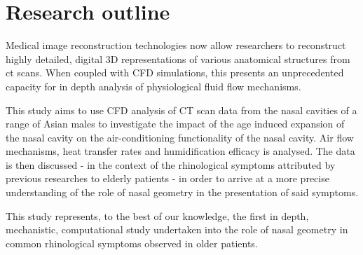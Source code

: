\section{Research outline}

Medical image reconstruction technologies now allow researchers to reconstruct highly detailed, digital 3D representations of various anatomical structures from ct scans. When coupled with CFD simulations, this presents an unprecedented capacity for in depth analysis of physiological fluid flow mechanisms.

This study aims to use CFD analysis of CT scan data from the nasal cavities of a range of Asian males to investigate the impact of the age induced expansion of the nasal cavity on the air-conditioning functionality of the nasal cavity. Air flow mechanisms, heat transfer rates and humidification efficacy is analysed. The data is then discussed - in the context of the rhinological symptoms attributed by previous researches to elderly patients - in order to arrive at a more precise understanding of the role of nasal geometry in the presentation of said symptoms.

This study represents, to the best of our knowledge, the first in depth, mechanistic, computational study undertaken into the role of nasal geometry in common rhinological symptoms observed in older patients.
